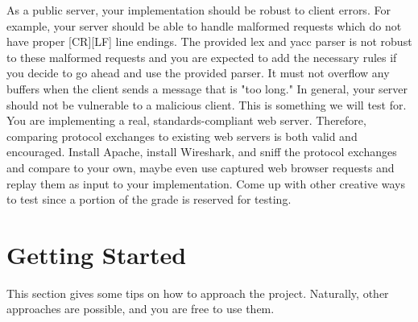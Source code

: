 \documentclass[12pt]{article}
\begin{document}
As a public server, your implementation should be robust to client
errors. For example, your server should be able to handle malformed
requests which do not have proper [CR][LF] line endings. The provided lex
and yacc parser is not robust to these malformed requests and you are
expected to add the necessary rules if you decide to go ahead and use
the provided parser. It must not overflow any buffers when the client
sends a message that is "too long." In general, your server should not
be vulnerable to a malicious client. This is something we will test for.
You are implementing a real, standards-compliant web server. Therefore,
comparing protocol exchanges to existing web servers is both valid and
encouraged. Install Apache, install Wireshark, and sniff the protocol
exchanges and compare to your own, maybe even use captured web browser
requests and replay them as input to your implementation.  Come up with
other creative ways to test since a portion of the grade is reserved
for testing.

\section{Getting Started}

This section gives some tips on how to approach the project. Naturally,
other approaches are possible, and you are free to use them.
\end{document}

